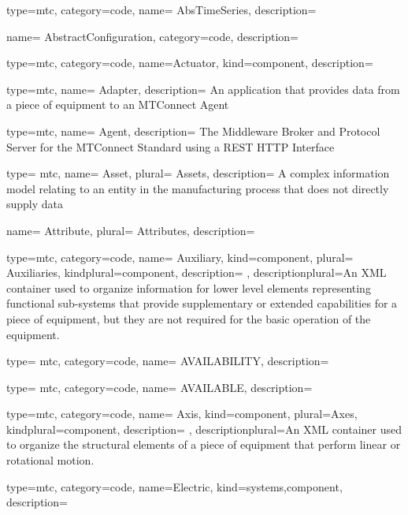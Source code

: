 

{
  type=mtc,
  category=code,
  name= {AbsTimeSeries},
  description= {}
}


{
  name= {AbstractConfiguration},
  category=code,
  description= {}
}


{
  type=mtc,
  category=code,
  name={Actuator},
  kind={component},
  description={}
}


{
  type=mtc,
  name= {Adapter},
  description= {An application that provides data from a piece of equipment to an MTConnect Agent}
}


{
  type=mtc,
  name= {Agent},
  description= {The Middleware Broker and Protocol Server for the MTConnect Standard using a REST HTTP Interface}
}


{
  type= mtc,
  name= {Asset},
  plural= {Assets},
  description= {A complex information model relating to an entity in the manufacturing process that does not directly supply data}
}


{
  name= {Attribute},
  plural= {Attributes},
  description= {}
}


{
  type=mtc,
  category=code,
  name= {Auxiliary},
  kind={component},
  plural= {Auxiliaries},
  kindplural={component},
  description= {},
  descriptionplural={An XML container used to organize information for \gls{lower level} elements representing functional sub-systems that provide supplementary or extended capabilities for a piece of equipment, but they are not required for the basic operation of the equipment.}
}


{
  type= mtc,
  category=code,
  name= {AVAILABILITY},
  description= {}
}


{
  type= mtc,
  category=code,
  name= {AVAILABLE},
  description= {}
}


{
  type=mtc,
  category=code,
  name= {Axis},
  kind={component},
  plural={Axes},
  kindplural={component},
  description= {},
  descriptionplural={An XML container used to organize the \glspl{structural element} of a piece of equipment that perform linear or rotational motion.}
}


{
  type=mtc,
  category=code,
  name={Electric},
  kind={systems,component},
  description={}
}


